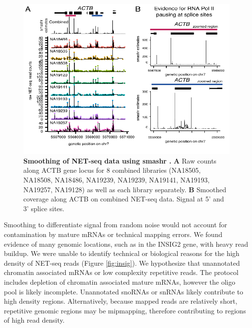 \begin{figure}
\centering \includegraphics[trim=0 .3in 0
  0,clip,width=5in]{img/ch04/Figure4.pdf}
\caption[Smoothing of NET-seq data using smashr ]{\textbf{Smoothing of NET-seq data using smashr \citep{xing_flexible_2016}.} {\bf A} Raw counts along ACTB gene locus for 8 combined libraries (NA18505, NA18508, NA18486, NA19239, NA19239, NA19141, NA19193, NA19257, NA19128) as well as each library separately. {\bf B} Smoothed coverage along ACTB on combined NET-seq data. Signal at 5' and 3' splice sites.}
\label{fig:smash}
\end{figure}
 
Smoothing to differentiate signal from random noise would not account for contamination by mature mRNAs or technical mapping errors. We found evidence of many genomic locations, such as in the INSIG2 gene, with heavy read buildup. We were unable to identify technical or biological reasons for the high density of NET-seq reads (Figure \ref{fig:insig}). We hypothesize that unannotated chromatin associated mRNAs or low complexity repetitive reads. The protocol includes depletion of chromatin associated mature mRNAs, however the oligo pool is likely incomplete. Unannotated snoRNAs or snRNAs likely contribute to high density regions. Alternatively, because mapped reads are relatively short, repetitive genomic regions may be mipmapping, therefore contributing to regions of high read density. 

